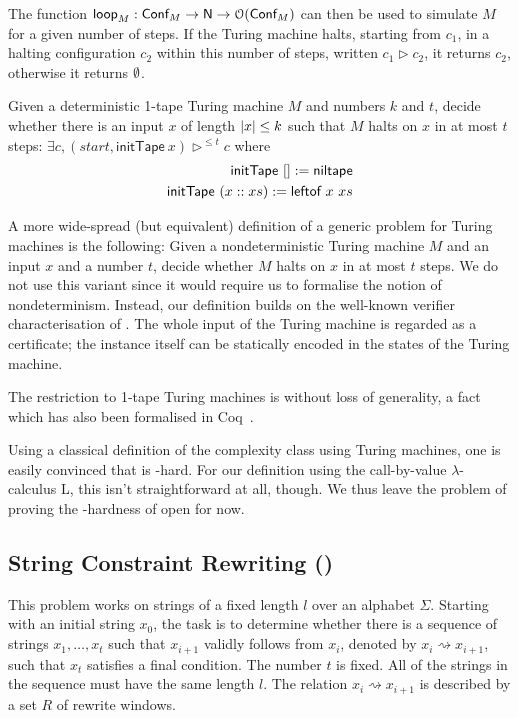 \documentclass[a4paper,UKenglish,cleveref, autoref]{lipics-v2019}
\newcommand{\strent}{\rightsquigarrow}
\begin{document}
The function $\textsf{loop}_M : \textsf{Conf}_M \rightarrow \mathsf{N} \rightarrow \mathcal{O}{(\textsf{Conf}_M)}$ can then be used to simulate $M$ for a given number of steps. If the Turing machine halts, starting from $c_1$, in a halting configuration $c_2$ within this number of steps, written $c_1 \rhd c_2$, it returns $c_2$, otherwise it returns $\emptyset$.


\begin{definition}[\gennp{}]
  Given a deterministic 1-tape Turing machine $M$ and numbers $k$ and $t$, decide whether there is an input $x$ of length $|x| \le k$ such that $M$ halts on $x$ in at most $t$ steps: 
  $\exists c, (\mathit{start}, \textsf{initTape}~x) \rhd^{\le t} c$
  where 
  \begin{align*}
    \textsf{initTape}~[] := \textsf{niltape}\\
    \textsf{initTape}~(x :: xs) := \textsf{leftof}~x~xs
  \end{align*}
\end{definition}

A more wide-spread (but equivalent) definition of a generic problem for Turing machines is the following: Given a nondeterministic Turing machine $M$ and an input $x$ and a number $t$, decide whether $M$ halts on $x$ in at most $t$ steps. 
We do not use this variant since it would require us to formalise the notion of nondeterminism. Instead, our definition builds on the well-known verifier characterisation of \NP{}. The whole input of the Turing machine is regarded as a certificate; the instance itself can be statically encoded in the states of the Turing machine.

The restriction to 1-tape Turing machines is without loss of generality, a fact which has also been formalised in Coq~\cite{ForsterEtAl:2019:VerifiedTMs}. 

Using a classical definition of the complexity class \NP{} using Turing machines, one is easily convinced that \gennp{} is \NP{}-hard. For our definition using the call-by-value $\lambda$-calculus L, this isn't straightforward at all, though. We thus leave the problem of proving the \NP{}-hardness of \gennp{} open for now.

\subsection*{String Constraint Rewriting (\strconrew{})}
This problem works on strings of a fixed length $l$ over an alphabet $\Sigma$. Starting with an initial string $x_0$, the task is to determine whether there is a sequence of strings $x_1, \ldots, x_t$ such that $x_{i+1}$ validly follows from $x_i$, denoted by $x_i \strent x_{i+1}$, such that $x_t$ satisfies a final condition. The number $t$ is fixed. All of the strings in the sequence must have the same length $l$. The relation $x_i \strent x_{i+1}$ is described by a set $R$ of rewrite windows.
\end{document}
